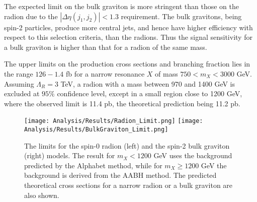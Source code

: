 The expected limit on the bulk graviton is more stringent than those on the radion due to the $|\Delta\eta(j_{1},j_{2})| < 1.3$ requirement. The bulk gravitons, being spin-2 particles, produce more central jets, and hence have higher efficiency with respect to this selection criteria, than the radions. Thus the signal sensitivity for a bulk graviton is higher than that for a radion of the same mass.

The upper limits on the production cross sections and branching fraction lies in the range $126-1.4$ fb for a narrow resonance $X$ of mass $750 < m_{X} < 3000$ GeV. Assuming $\Lambda_{R}= 3$ TeV, a radion with a mass between 970 and 1400 GeV is excluded at $95\%$ confidence level, except in a small region close to 1200 GeV, where the observed limit is 11.4 pb, the theoretical prediction being 11.2 pb. 

\begin{figure}[h]
\centering
\texttt{[image: Analysis/Results/Radion\_Limit.png]}
\texttt{[image: Analysis/Results/BulkGraviton\_Limit.png]}
\caption{The limits for the spin-0 radion (left) and the spin-2 bulk graviton (right) models. The result for $m_{X}<1200$ GeV uses the background predicted by the Alphabet method, while for $m_{X}\ge 1200$ GeV the background is derived from the AABH method. The predicted theoretical cross sections for a narrow radion or a bulk graviton are also shown.}
\label{fig:Limits}
\end{figure}

